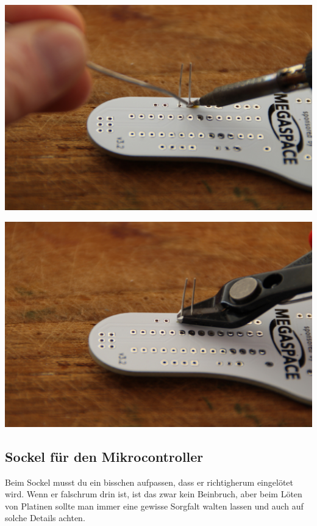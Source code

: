 \documentclass{article}
\begin{document}
\begin{minipage}[b]{0.5\textwidth}
	\includegraphics[width=\textwidth]{Bilder2023/IMG_8341.JPG}
\end{minipage}
\begin{minipage}[b]{0.5\textwidth}
	\includegraphics[width=\textwidth]{Bilder2023/IMG_8342.JPG}
\end{minipage}

\vspace{0.5cm}

\subsection{Sockel für den Mikrocontroller}

Beim Sockel musst du ein bisschen aufpassen, dass er richtigherum eingelötet wird. Wenn er falschrum drin ist, ist das zwar kein Beinbruch, aber beim Löten von Platinen sollte man immer eine gewisse Sorgfalt walten lassen und auch auf solche Details achten.
\end{document}
